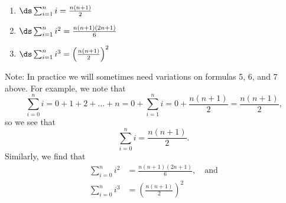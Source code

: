 {
\begin{theorem}\label{thm:summation}
~\\[-\baselineskip]\noindent\begin{minipage}[t]{200pt}
\iflatexml{}
\end{minipage}%
\begin{minipage}[t]{150pt}
\begin{enumerate}[resume=summationprop]
\fi
	\item	$\ds \sum_{i=1}^n i = \frac{n(n+1)}2$
	\item	$\ds \sum_{i=1}^n i^2 = \frac{n(n+1)(2n+1)}6$
	\item	$\ds \sum_{i=1}^n i^3 = \left(\frac{n(n+1)}2\right)^2$
	\end{enumerate}
\end{minipage}
\end{theorem}
}

Note: In practice we will sometimes need variations on formulas 5, 6, and 7 above. For example, we note that
\[
\sum_{i=0}^n i=0+1+2+\dots+n
=0+\sum_{i=1}^n i=0+\frac{n(n+1)}{2}
=\frac{n(n+1)}{2}\text{,}
\]
so we see that \[\sum_{i=0}^n i=\frac{n(n+1)}{2}.\] Similarly, we find that 
\begin{align*}
\sum_{i=0}^n i^2&=\frac{n(n+1)(2n+1)}{6},\quad\text{and}\\
\sum_{i=0}^n i^3&=\left(\frac{n(n+1)}{2}\right)^2\\
\end{align*}

